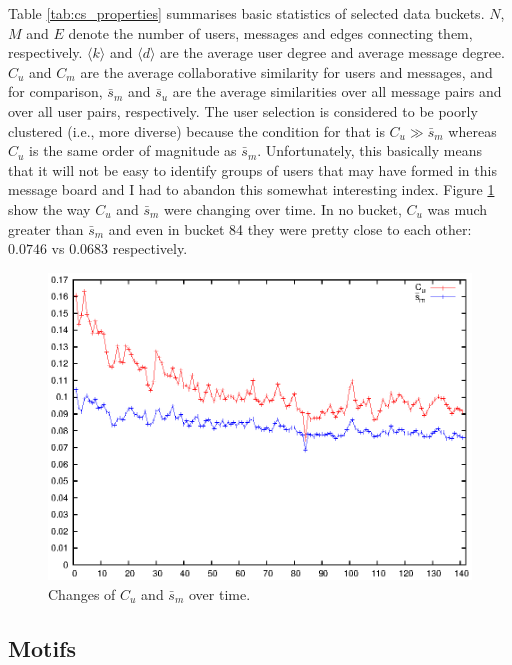       Table \ref{tab:cs_properties} summarises basic statistics of selected data buckets. $N$, $M$ and $E$ denote the number of users, messages and edges connecting them, respectively. $\langle k \rangle$ and $\langle d \rangle$ are the average user degree and average message degree. $C_u$ and $C_m$ are the average collaborative similarity for users and messages, and for comparison, $\bar s_m$ and $\bar s_u$ are the average similarities over all message pairs and over all user pairs, respectively. The user selection is considered to be poorly clustered (i.e., more diverse) because the condition for that is $C_u \gg \bar s_m$ whereas $C_u$ is the same order of magnitude as $\bar s_m$. Unfortunately, this basically means that it will not be easy to identify groups of users that may have formed in this message board and I had to abandon this somewhat interesting index. Figure \ref{fig:cs_cusm} show the way $C_u$ and $\bar s_m$ were changing over time. In no bucket, $C_u$ was much greater than $\bar s_m$ and even in bucket 84 they were pretty close to each other: $0.0746$ vs $0.0683$ respectively.
      \begin{figure}[H]
        \includegraphics[width=\textwidth]{chapters/03_implementation/C_us_m}
        \caption{Changes of $C_u$ and $\bar s_m$ over time.}
        \label{fig:cs_cusm}
      \end{figure}

  \subsection{Motifs}
      
      
      
      
      